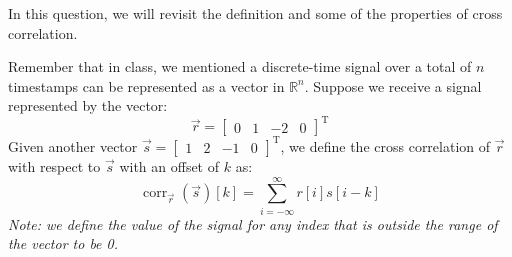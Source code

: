 In this question, we will revisit the definition and some of the properties of cross correlation. 

Remember that in class, we mentioned a discrete-time signal over a total of $n$ timestamps can be represented as a vector in $\mathbb{R}^n$. Suppose we receive a signal represented by the vector:
$$\vec{r} = \begin{bmatrix}
0 & 1 & -2 & 0
\end{bmatrix}^\mathrm{T}$$
Given another vector $\vec{s} = \begin{bmatrix}1 & 2 & -1 & 0\end{bmatrix}^\mathrm{T}$, we define the cross correlation of $\vec{r}$ with respect to $\vec{s}$ with an offset of $k$ as:
    $$\operatorname{corr}_{\vec{r}}(\vec{s})[k]=\sum_{i=-\infty}^{\infty} r[i] s[i-k]$$
    \textit{Note: we define the value of the signal for any index that is outside the range of the vector to be 0.}
    
    
